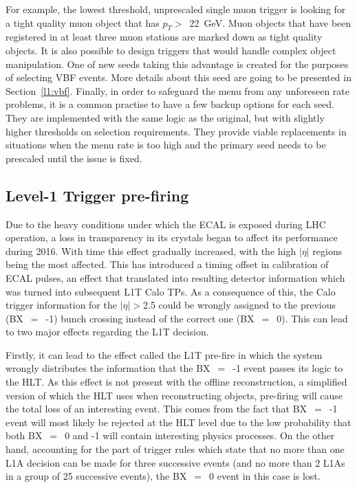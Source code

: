 \hspace{10pt}For example, the lowest threshold, unprescaled single muon trigger is looking for a tight quality muon object that has $p_T>$~22~GeV. Muon objects that have been registered in at least three muon stations are marked down as tight quality objects. It is also possible to design triggers that would handle complex object manipulation. One of new seeds taking this advantage is created for the purposes of selecting VBF events. More details about this seed are going to be presented in Section~\ref{l1:vbf}. Finally, in order to safeguard the menu from any unforeseen rate problems, it is a common practise to have a few backup options for each seed. They are implemented with the same logic as the original, but with slightly higher thresholds on selection requirements. They provide viable replacements in situations when the menu rate is too high and the primary seed needs to be prescaled until the issue is fixed. 

\subsection{Level-1 Trigger pre-firing}
\label{sec:l1_prefire}
\hspace{10pt} Due to the heavy conditions under which the ECAL is exposed during LHC operation, a loss in transparency in its crystals began to affect its performance during 2016. With time this effect gradually increased, with the high $|\eta|$ regions being the most affected. This has introduced a timing offset in calibration of ECAL pulses, an effect that translated into resulting detector information which was turned into subsequent L1T Calo TPs. As a consequence of this, the Calo trigger information for the $|\eta|>$2.5 could be wrongly assigned to the previous (BX~$=$~-1) bunch crossing instead of the correct one (BX~$=$~0). This can lead to two major effects regarding the L1T decision.

\hspace{10pt} Firstly, it can lead to the effect called the L1T pre-fire in which the system wrongly distributes the information that the BX~$=$~-1 event passes its logic to the HLT. As this effect is not present with the offline reconstruction, a simplified version of which the HLT uses when reconstructing objects, pre-firing will cause the total loss of an interesting event. This comes from the fact that BX~$=$~-1 event will most likely be rejected at the HLT level due to the low probability that both BX~$=$~0 and -1  will contain interesting physics processes. On the other hand, accounting for the part of trigger rules which state that no more than one L1A decision can be made for three successive events (and no more than 2 L1As in a group of 25 successive events), the BX~$=$~0 event in this case is lost.

